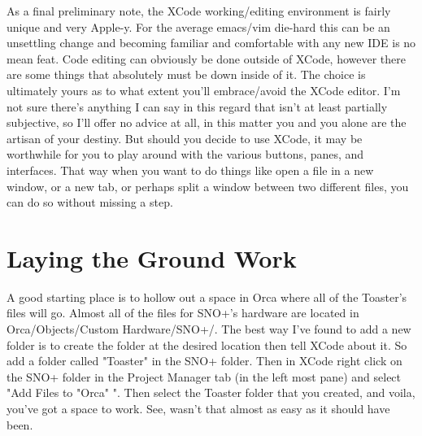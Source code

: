 \documentclass[12pt,a4paper]{article}
\begin{document}
 
 As a final preliminary note, the XCode working/editing environment is fairly unique and very Apple-y. 
 For the average emacs/vim die-hard this can be an unsettling change and 
 becoming familiar and comfortable with any new IDE is no mean feat. 
 Code editing can obviously be done outside of XCode, however there are some things that absolutely must be down inside of it.
 The choice is ultimately yours as to what extent you'll embrace/avoid the XCode editor.
 I'm not sure there's anything I can say in this regard that isn't at least partially subjective,
 so I'll offer no advice at all, in this matter you and you alone are the artisan of your destiny.
But should you decide to use XCode, it may be worthwhile for you to play around with the various buttons, panes,  and interfaces.
 That way when you want to do things like open a file in a new window, or a new tab, or perhaps split a window between two different files, you can do so without missing a step.

 
 
\section{Laying the Ground Work}
A good starting place is to hollow out a space in Orca where all of the Toaster's files will go.
 Almost all of the files for SNO+'s hardware are located in Orca/Objects/Custom Hardware/SNO+/.
  The best way I've found to add a new folder is to create the folder at the desired location then tell XCode about it.
So add a folder called "Toaster" in the SNO+ folder.
 Then in XCode right click on the SNO+ folder in the Project Manager tab (in the left most pane) and select "Add Files to "Orca" ".
  Then select the Toaster folder that you created, and voila, you've got a space to work.
   See, wasn't that almost as easy as it should have been.  
\end{document}
